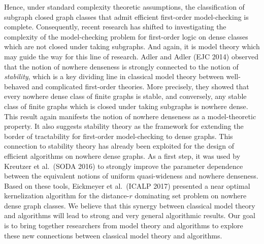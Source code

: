 Hence, under
standard complexity theoretic assumptions, the classification of
subgraph closed graph classes that admit efficient first-order 
model-checking is complete. Consequently, recent research 
has shifted to investigating the complexity of the model-checking
problem for first-order logic on dense classes which are not closed 
under taking subgraphs. And again, it is model theory which may
guide the way for this line of research. Adler and Adler (EJC 2014) observed
that the notion of nowhere denseness is strongly connected 
to the notion of \emph{stability}, which is a key dividing line 
in classical model theory between well-behaved and complicated 
first-order theories. More precisely, they showed that 
every nowhere dense class of finite graphs is stable, and conversely,
any stable class of finite graphs which is closed under taking 
subgraphs is nowhere dense. This result again manifests the notion of
nowhere denseness as a model-theoretic property. It also suggests 
stability theory as the framework for extending the border of 
tractability for first-order model-checking to dense graphs. 
This connection to stability theory has already been exploited for
the design of efficient algorithms on nowhere dense graphs. 
As a first step, it was used by Kreutzer et al.\ (SODA 2016) 
to strongly improve 
the parameter dependence between the equivalent notions of 
uniform quasi-wideness and nowhere denseness. Based on these
tools, Eickmeyer et al.\ (ICALP 2017) presented a near optimal 
kernelization algorithm for the distance-$r$ dominating set problem
on nowhere dense graph classes. We believe that this synergy 
between classical model theory and algorithms will lead to 
strong and very general algorithmic results. Our goal is to bring
together researchers from model theory and algorithms to 
explore these new connections between classical model theory
and algorithms. 
